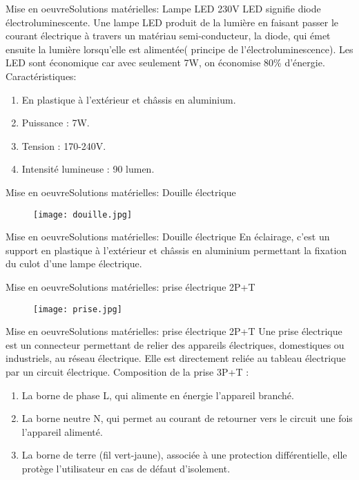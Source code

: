 \documentclass{beamer}
\begin{document}
	\begin{frame}{Mise en oeuvre}{Solutions matérielles: Lampe LED 230V}
		LED signifie diode électroluminescente. Une lampe LED produit de la lumière en faisant passer le courant électrique à travers un matériau semi-conducteur, la diode, qui émet ensuite la lumière lorsqu'elle est alimentée( principe de l'électroluminescence). Les LED sont économique car avec seulement 7W, on économise 80\% d'énergie. Caractéristiques: 
		\begin{enumerate}
			\item En plastique à l’extérieur et châssis en aluminium.
			\item Puissance : 7W.
			\item Tension : 170-240V.
			\item Intensité lumineuse : 90 lumen.
		\end{enumerate}   	
	\end{frame}
	
	\begin{frame}{Mise en oeuvre}{Solutions matérielles: Douille électrique}
		\begin{figure}\centering
			\texttt{[image: douille.jpg]}
		\end{figure}	
	\end{frame}
	
	\begin{frame}{Mise en oeuvre}{Solutions matérielles: Douille électrique}
		En éclairage, c'est un support en plastique à l'extérieur et châssis en aluminium permettant la fixation du culot d'une lampe électrique.
	\end{frame}
	
	\begin{frame}{Mise en oeuvre}{Solutions matérielles: prise électrique 2P+T}
		\begin{figure}\centering
			\texttt{[image: prise.jpg]}
		\end{figure}	
	\end{frame}
	
	\begin{frame}{Mise en oeuvre}{Solutions matérielles: prise électrique 2P+T}
		Une prise électrique est un connecteur permettant de relier des appareils électriques, domestiques ou industriels, au réseau électrique. Elle est directement reliée au tableau électrique par un circuit électrique. Composition de la prise 3P+T :
		\begin{enumerate}
			\item La borne de phase L, qui alimente en énergie l’appareil branché.
			\item 	La borne neutre N, qui permet au courant de retourner vers le circuit une fois l’appareil alimenté.
			\item La borne de terre (fil vert-jaune),  associée à une protection différentielle, elle protège l’utilisateur en cas de défaut d'isolement.
		\end{enumerate}
		
	\end{frame}
	
\end{document}
